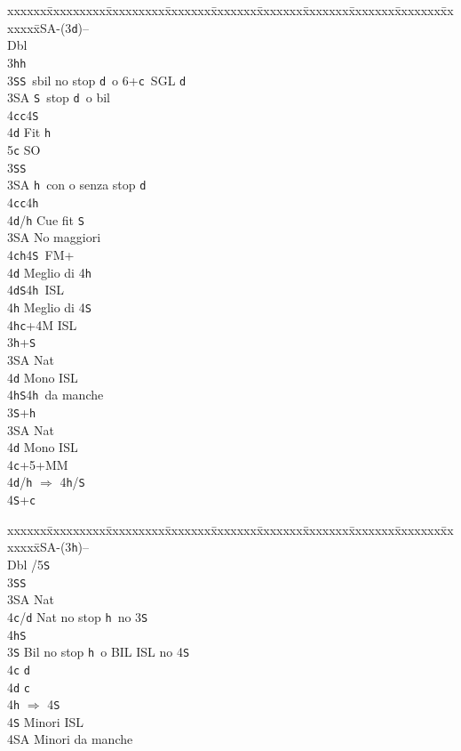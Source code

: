 \documentclass[a4paper,italian]{article}
\newcommand{\BS}{\small{\texttt{S}}}
\newcommand{\BC}{\small{\texttt{c}}}
\newcommand{\BD}{\small{\texttt{d}}}
\newcommand{\BH}{\small{\texttt{h}}}
\newenvironment{bidtable}
{\begin{tabbing}

    xxxxxx\=xxxxxxxxx\=xxxxxxxxx\=xxxxxxx\=xxxxxxx\=xxxxxxx\=xxxxxxx\=xxxxxxx\=xxxxxxx\=xxxxxxx\=\kill}
{\end{tabbing} }%
\begin{document}
\begin{multicols}{2}
    \begin{bidtable}
        1\small{SA}-(3\BD)--\+\\
        Dbl\+\\
        3\BH {}\BH \+\\
        3\BS {}\BS\ sbil no stop \BD\ o 6+\BC\ SGL \BD\\
        3\small{SA} \BS\ stop \BD\ o bil\\
        4\BC {}\BC4\BS\\
        4\BD \> Fit \BH \\
        5\BC \> SO\-\\
        3\BS {}\BS \+\\
        3\small{SA} \BH\ con o senza stop \BD \\
        4\BC {}\BC4\BH\\
        4\BD/\BH \> Cue fit \BS \-\\
        3\small{SA} \> No maggiori\+\\
        4\BC {}\BH 4\BS\ FM+\+\\
        4\BD \> Meglio di 4\BH \-\\
        4\BD {}\BS 4\BH\ ISL\+\\
        4\BH \> Meglio di 4\BS \-\\
        4\BH {}\BC +4M ISL\-\-\\
        3\BH {}+\BS \+\\
        3\small{SA} \> Nat\+\\
        4\BD \> Mono ISL\\
        4\BH {}\BS 4\BH\ da manche\-\-\\
        3\BS {}+\BH \+\\
        3\small{SA} \> Nat\+\\
        4\BD \> Mono ISL\-\-\\
        4\BC {}+5+MM\\
        4\BD/\BH \> $\Rightarrow$ 4\BH /\BS \\
        4\BS {}+\BC \-
    \end{bidtable}

    \begin{bidtable}
        1\small{SA}-(3\BH)--\+\\
        Dbl /5\BS\ \+\\
        3\BS{}\BS\ \\
        3\small{SA}\> Nat\\
        4\BC/\BD\> Nat no stop \BH\ no 3\BS\ \\
        4\BH{}\BS \-\\
        3\BS \> Bil no stop \BH\ o BIL ISL no 4\BS \\
        4\BC \> \BD \\
        4\BD \> \BC \\
        4\BH \> $\Rightarrow$ 4\BS \\
        4\BS \> Minori ISL\\
        4\small{SA} \> Minori da manche\-
    \end{bidtable}


\end{multicols}
\end{document}

